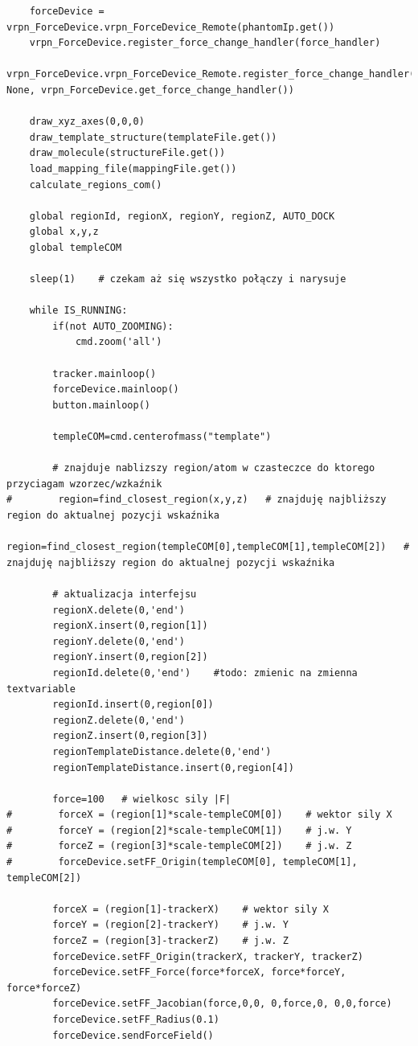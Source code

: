 \documentclass[licencjacka]{pracamgr}
\begin{document}
\begin{lstlisting}
    forceDevice = vrpn_ForceDevice.vrpn_ForceDevice_Remote(phantomIp.get())
    vrpn_ForceDevice.register_force_change_handler(force_handler)
    vrpn_ForceDevice.vrpn_ForceDevice_Remote.register_force_change_handler(forceDevice, None, vrpn_ForceDevice.get_force_change_handler())
    
    draw_xyz_axes(0,0,0)
    draw_template_structure(templateFile.get())
    draw_molecule(structureFile.get())
    load_mapping_file(mappingFile.get())
    calculate_regions_com()
    
    global regionId, regionX, regionY, regionZ, AUTO_DOCK
    global x,y,z
    global templeCOM
    
    sleep(1)    # czekam aż się wszystko połączy i narysuje
    
    while IS_RUNNING:
        if(not AUTO_ZOOMING):
            cmd.zoom('all')
            
        tracker.mainloop()
        forceDevice.mainloop()
        button.mainloop()
        
        templeCOM=cmd.centerofmass("template")
        
        # znajduje nablizszy region/atom w czasteczce do ktorego przyciagam wzorzec/wzkaźnik
#        region=find_closest_region(x,y,z)   # znajduję najbliższy region do aktualnej pozycji wskaźnika
        region=find_closest_region(templeCOM[0],templeCOM[1],templeCOM[2])   # znajduję najbliższy region do aktualnej pozycji wskaźnika
        
        # aktualizacja interfejsu
        regionX.delete(0,'end')
        regionX.insert(0,region[1])
        regionY.delete(0,'end')
        regionY.insert(0,region[2])
        regionId.delete(0,'end')    #todo: zmienic na zmienna textvariable
        regionId.insert(0,region[0])
        regionZ.delete(0,'end')
        regionZ.insert(0,region[3])
        regionTemplateDistance.delete(0,'end')
        regionTemplateDistance.insert(0,region[4])
        
        force=100   # wielkosc sily |F|
#        forceX = (region[1]*scale-templeCOM[0])    # wektor sily X
#        forceY = (region[2]*scale-templeCOM[1])    # j.w. Y
#        forceZ = (region[3]*scale-templeCOM[2])    # j.w. Z
#        forceDevice.setFF_Origin(templeCOM[0], templeCOM[1], templeCOM[2])
        
        forceX = (region[1]-trackerX)    # wektor sily X
        forceY = (region[2]-trackerY)    # j.w. Y
        forceZ = (region[3]-trackerZ)    # j.w. Z
        forceDevice.setFF_Origin(trackerX, trackerY, trackerZ)
        forceDevice.setFF_Force(force*forceX, force*forceY, force*forceZ)
        forceDevice.setFF_Jacobian(force,0,0, 0,force,0, 0,0,force)
        forceDevice.setFF_Radius(0.1)
        forceDevice.sendForceField()


\end{lstlisting}
\end{document}
